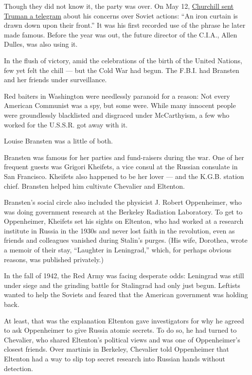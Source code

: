 Though they did not know it, the party was over. On May 12,
\href{https://www.cvce.eu/content/publication/1997/10/13/b62aff77-24ff-40af-a730-344a9b428cc8/publishable_en.pdf}{Churchill
sent Truman a telegram} about his concerns over Soviet actions: ``An
iron curtain is drawn down upon their front.'' It was his first recorded
use of the phrase he later made famous. Before the year was out, the
future director of the C.I.A., Allen Dulles, was also using it.

In the flush of victory, amid the celebrations of the birth of the
United Nations, few yet felt the chill --- but the Cold War had begun.
The F.B.I. had Bransten and her friends under surveillance.

Red baiters in Washington were needlessly paranoid for a reason: Not
every American Communist was a spy, but some were. While many innocent
people were groundlessly blacklisted and disgraced under McCarthyism, a
few who worked for the U.S.S.R. got away with it.

Louise Bransten was a little of both.

Bransten was famous for her parties and fund-raisers during the war. One
of her frequent guests was Grigori Kheifets, a vice consul at the
Russian consulate in San Francisco. Kheifets also happened to be her
lover --- and the K.G.B. station chief. Bransten helped him cultivate
Chevalier and Eltenton.

Bransten's social circle also included the physicist J. Robert
Oppenheimer, who was doing government research at the Berkeley Radiation
Laboratory. To get to Oppenheimer, Kheifets set his sights on Eltenton,
who had worked at a research institute in Russia in the 1930s and never
lost faith in the revolution, even as friends and colleagues vanished
during Stalin's purges. (His wife, Dorothea, wrote a memoir of their
stay, ``Laughter in Leningrad,'' which, for perhaps obvious reasons, was
published privately.)

In the fall of 1942, the Red Army was facing desperate odds: Leningrad
was still under siege and the grinding battle for Stalingrad had only
just begun. Leftists wanted to help the Soviets and feared that the
American government was holding back.

At least, that was the explanation Eltenton gave investigators for why
he agreed to ask Oppenheimer to give Russia atomic secrets. To do so, he
had turned to Chevalier, who shared Eltenton's political views and was
one of Oppenheimer's closest friends. Over martinis in Berkeley,
Chevalier told Oppenheimer that Eltenton had a way to slip top secret
research into Russian hands without detection.

